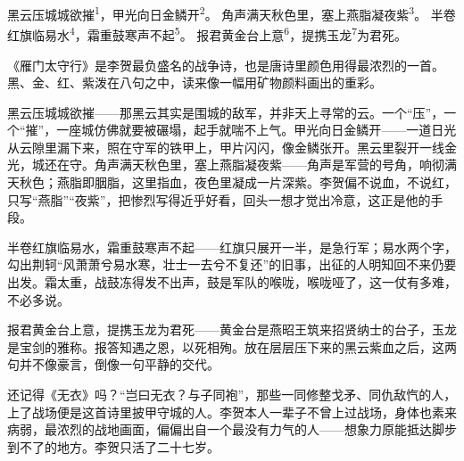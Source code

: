 
\begin{poem}
黑云压城城欲摧\textsuperscript{1}，甲光向日金鳞开\textsuperscript{2}。
角声满天秋色里，塞上燕脂凝夜紫\textsuperscript{3}。
半卷红旗临易水\textsuperscript{4}，霜重鼓寒声不起\textsuperscript{5}。
报君黄金台上意\textsuperscript{6}，提携玉龙\textsuperscript{7}为君死。
\end{poem}

\begin{annotations}
\end{annotations}

\begin{appreciation}
《雁门太守行》是李贺最负盛名的战争诗，也是唐诗里颜色用得最浓烈的一首。黑、金、红、紫泼在八句之中，读来像一幅用矿物颜料画出的重彩。

黑云压城城欲摧——那黑云其实是围城的敌军，并非天上寻常的云。一个“压”，一个“摧”，一座城仿佛就要被碾塌，起手就喘不上气。甲光向日金鳞开——一道日光从云隙里漏下来，照在守军的铁甲上，甲片闪闪，像金鳞张开。黑云里裂开一线金光，城还在守。角声满天秋色里，塞上燕脂凝夜紫——角声是军营的号角，响彻满天秋色；燕脂即胭脂，这里指血，夜色里凝成一片深紫。李贺偏不说血，不说红，只写“燕脂”“夜紫”，把惨烈写得近乎好看，回头一想才觉出冷意，这正是他的手段。

半卷红旗临易水，霜重鼓寒声不起——红旗只展开一半，是急行军；易水两个字，勾出荆轲“风萧萧兮易水寒，壮士一去兮不复还”的旧事，出征的人明知回不来仍要出发。霜太重，战鼓冻得发不出声，鼓是军队的喉咙，喉咙哑了，这一仗有多难，不必多说。

报君黄金台上意，提携玉龙为君死——黄金台是燕昭王筑来招贤纳士的台子，玉龙是宝剑的雅称。报答知遇之恩，以死相殉。放在层层压下来的黑云紫血之后，这两句并不像豪言，倒像一句平静的交代。

还记得《无衣》吗？“岂曰无衣？与子同袍”，那些一同修整戈矛、同仇敌忾的人，上了战场便是这首诗里披甲守城的人。李贺本人一辈子不曾上过战场，身体也素来病弱，最浓烈的战地画面，偏偏出自一个最没有力气的人——想象力原能抵达脚步到不了的地方。李贺只活了二十七岁。
\end{appreciation}
